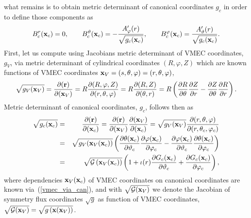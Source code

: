 \documentclass[12pt]{article}
\newcommand{\be}[1]{\begin{equation} \label{#1}}
\newcommand{\ee}{\end{equation}}
\newcommand{\bea}[1]{\begin{eqnarray} \label{#1}}
\newcommand{\eea}{\end{eqnarray}}
\newcommand{\eq}[1]{(\ref{#1})}
\newcommand{\difp}[2]{\frac{\partial #1}{\partial #2}}
\newcommand{\br}{{\bf r}}
\newcommand{\bx}{{\bf x}}
\newcommand{\cg}{{\cal G}}
\begin{document}
what remains is to obtain metric determinant of canonical coordinates $g_c$ in order to define those components as
\be{conraBcomp_can}
B^r_c(\bx_c)=0,
\qquad B^\vartheta_c(\bx_c)
= -\frac{A_\varphi^\prime(r)}{\sqrt{g_c(\bx_c)}},
\qquad B^\varphi_c(\bx_c)
= \frac{A_\vartheta^\prime(r)}{\sqrt{g_c(\bx_c)}}.
\ee
First, let us compute using Jacobians metric determinant of VMEC coordinates, $g_V$, 
via metric determinant of cylindrical coordinates $(R,\varphi,Z)$ which are known functions of VMEC coordinates 
$\bx_V=(s,\theta,\varphi)=(r,\theta,\varphi)$,
\be{g_VMEC}
\sqrt{g_V(\bx_V)}=\difp{(\br)}{(\bx_V)}=R\difp{(R,\varphi,Z)}{(r,\theta,\varphi)}=R\difp{(R,Z)}{(\theta,r)}
=R\left(\difp{R}{\theta}\difp{Z}{r}-\difp{Z}{\theta}\difp{R}{r}\right).
\ee
Metric determinant of canonical coordinates, $g_c$, follows then as
\bea{g_can}
\sqrt{g_c(\bx_c)}
&=&
\difp{(\br)}{(\bx_c)}=\difp{(\br)}{(\bx_V)}\difp{(\bx_V)}{(\bx_c)}
=\sqrt{g_V(\bx_V)}\difp{(r,\theta,\varphi)}{(r,\theta_c,\varphi_c)}
\nonumber \\
&=&
\sqrt{g_V(\bx_V(\bx_c))}\left(\difp{\theta(\bx_c)}{\vartheta_c}\difp{\varphi(\bx_c)}{\varphi_c}
-\difp{\varphi(\bx_c)}{\vartheta_c}\difp{\theta(\bx_c)}{\varphi_c}\right)
\nonumber \\
&=&
\sqrt{\cg\left(\bx_V(\bx_c)\right)}\left(1+\iota(r) \difp{G_c(\bx_c)}{\vartheta_c}+\difp{G_c(\bx_c)}{\varphi_c}\right),
\eea
where dependencies $\bx_V(\bx_c)$ of VMEC coordinates on canonical coordinates are known via~\eq{vmec_via_can},
and with $\sqrt{\cg(\bx_V)}$ we denote the Jacobian of symmetry flux coordinates $\sqrt{g}$ as function of VMEC coordinates,
$\sqrt{\cg(\bx_V)}=\sqrt{g\left(\bx(\bx_V)\right)}$.
\end{document}
